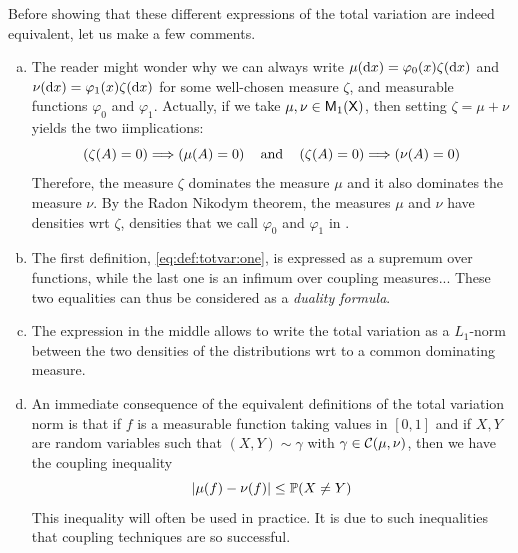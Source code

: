 \documentclass[english,graybox,envcountchap,envcountsame,sectrefs,shortlabels]{svmono}
\theoremstyle{style}
\begin{document}
Before showing that these different expressions of the total variation are indeed equivalent, let us make a few comments.
\begin{leftbar}
\begin{enumerate}[(a)]
\item The reader might wonder why we can always write $\mu(\mathrm{d} x)=\varphi_0(x) \zeta(\mathrm{d} x)$ and $\nu(\mathrm{d} x)=\varphi_1(x) \zeta(\mathrm{d} x)$ for some well-chosen measure $\zeta$, and measurable functions $\varphi_0$ and $\varphi_1$. Actually, if we take $\mu,\nu \in \mathsf{M}_{1}(\mathsf{X})$, then setting $\zeta=\mu+\nu$ yields the two iimplications:
 $$
 \left(\zeta(A)=0\right) \Longrightarrow \left(\mu(A)=0\right) \quad \mbox{and} \quad   \left(\zeta(A)=0\right) \Longrightarrow \left(\nu(A)=0\right)
 $$
Therefore, the measure $\zeta$ dominates the measure $\mu$ and it also dominates the measure $\nu$. By the Radon Nikodym theorem, the measures $\mu$ and $\nu$ have densities wrt $\zeta$, densities that we call $\varphi_0$ and $\varphi_1$ in .
\item The first definition, \eqref{eq:def:totvar:one}, is expressed as a supremum over functions, while the last one is an infimum over coupling measures... These two equalities can thus be considered as a {\em duality formula}.
\item The expression in the middle allows to write the total variation as a $L_1$-norm between the two densities of the distributions wrt to a common dominating measure.
\item An immediate consequence of the equivalent definitions of the total variation norm is that if $f$ is a measurable function taking values in $[0,1]$ and if $X,Y$ are random variables such that $(X,Y)\sim \gamma$ with $\gamma\in \mathcal{C}(\mu,\nu)$, then we have the coupling inequality 
$$
|\mu(f)-\nu(f)|\leq \mathbb{P}(X\neq Y)
$$
This inequality will often be used in practice. It is due to such inequalities that coupling techniques are so successful.
\end{enumerate}
\end{leftbar}
\end{document}

